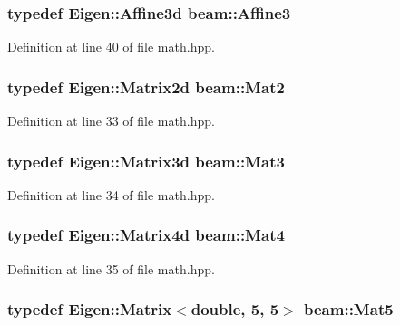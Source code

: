 \subsubsection[{\texorpdfstring{Affine3}{Affine3}}]{\setlength{\rightskip}{0pt plus 5cm}typedef Eigen\+::\+Affine3d {\bf beam\+::\+Affine3}}\hypertarget{group__utils_ga609e7e934806a61b3cb511b893f799ce}{}\label{group__utils_ga609e7e934806a61b3cb511b893f799ce}


Definition at line 40 of file math.\+hpp.

\subsubsection[{\texorpdfstring{Mat2}{Mat2}}]{\setlength{\rightskip}{0pt plus 5cm}typedef Eigen\+::\+Matrix2d {\bf beam\+::\+Mat2}}\hypertarget{group__utils_gaa647b85b058c8a50386a3da8dd719e3d}{}\label{group__utils_gaa647b85b058c8a50386a3da8dd719e3d}


Definition at line 33 of file math.\+hpp.

\subsubsection[{\texorpdfstring{Mat3}{Mat3}}]{\setlength{\rightskip}{0pt plus 5cm}typedef Eigen\+::\+Matrix3d {\bf beam\+::\+Mat3}}\hypertarget{group__utils_ga665fed2673de952d12b19351a2bdb961}{}\label{group__utils_ga665fed2673de952d12b19351a2bdb961}


Definition at line 34 of file math.\+hpp.

\subsubsection[{\texorpdfstring{Mat4}{Mat4}}]{\setlength{\rightskip}{0pt plus 5cm}typedef Eigen\+::\+Matrix4d {\bf beam\+::\+Mat4}}\hypertarget{group__utils_ga06979ede648a91a7e5465980784ebb1b}{}\label{group__utils_ga06979ede648a91a7e5465980784ebb1b}


Definition at line 35 of file math.\+hpp.

\subsubsection[{\texorpdfstring{Mat5}{Mat5}}]{\setlength{\rightskip}{0pt plus 5cm}typedef Eigen\+::\+Matrix$<$double, 5, 5$>$ {\bf beam\+::\+Mat5}}\hypertarget{group__utils_ga34f1d113f166129c5b89fe92c5a07e02}{}\label{group__utils_ga34f1d113f166129c5b89fe92c5a07e02}


